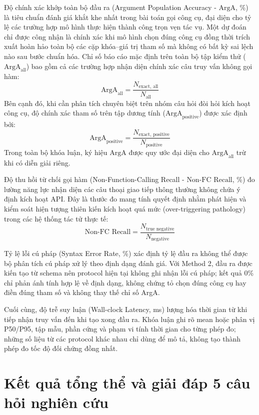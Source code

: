 Độ chính xác khớp toàn bộ đầu ra (Argument Population Accuracy - $\text{ArgA}$, \%) là tiêu chuẩn đánh giá khắt khe nhất trong bài toán gọi công cụ, đại diện cho tỷ lệ các trường hợp mô hình thực hiện thành công trọn vẹn tác vụ. Một dự đoán chỉ được công nhận là chính xác khi mô hình chọn đúng công cụ đồng thời trích xuất hoàn hảo toàn bộ các cặp khóa–giá trị tham số mà không có bất kỳ sai lệch nào sau bước chuẩn hóa. Chỉ số báo cáo mặc định trên toàn bộ tập kiểm thử ($\text{ArgA}_{\text{all}}$) bao gồm cả các trường hợp nhận diện chính xác câu truy vấn không gọi hàm:
$$\text{ArgA}_{\text{all}} = \frac{N_{\text{exact, all}}}{N_{\text{all}}}$$
Bên cạnh đó, khi cần phân tích chuyên biệt trên nhóm câu hỏi đòi hỏi kích hoạt công cụ, độ chính xác tham số trên tập dương tính ($\text{ArgA}_{\text{positive}}$) được xác định bởi:
$$\text{ArgA}_{\text{positive}} = \frac{N_{\text{exact, positive}}}{N_{\text{positive}}}$$
Trong toàn bộ khóa luận, ký hiệu $\text{ArgA}$ được quy ước đại diện cho $\text{ArgA}_{\text{all}}$ trừ khi có diễn giải riêng.

Độ thu hồi từ chối gọi hàm (Non-Function-Calling Recall - $\text{Non-FC Recall}$, \%) đo lường năng lực nhận diện các câu thoại giao tiếp thông thường không chứa ý định kích hoạt API. Đây là thước đo mang tính quyết định nhằm phát hiện và kiểm soát hiện tượng thiên kiến kích hoạt quá mức (over-triggering pathology) trong các hệ thống tác tử thực tế:
$$\text{Non-FC Recall} = \frac{N_{\text{true negative}}}{N_{\text{negative}}}$$

Tỷ lệ lỗi cú pháp (Syntax Error Rate, \%) xác định tỷ lệ đầu ra không thể được bộ phân tích cú pháp xử lý theo định dạng đánh giá. Với Method 2, đầu ra được kiến tạo từ schema nên protocol hiện tại không ghi nhận lỗi cú pháp; kết quả 0\% chỉ phản ánh tính hợp lệ về định dạng, không chứng tỏ chọn đúng công cụ hay điền đúng tham số và không thay thế chỉ số ArgA.

Cuối cùng, độ trễ suy luận (Wall-clock Latency, ms) lượng hóa thời gian từ khi tiếp nhận truy vấn đến khi tạo xong đầu ra. Khóa luận ghi rõ mean hoặc phân vị P50/P95, tập mẫu, phần cứng và phạm vi tính thời gian cho từng phép đo; những số liệu từ các protocol khác nhau chỉ dùng để mô tả, không tạo thành phép đo tốc độ đối chứng đồng nhất.

\section{Kết quả tổng thể và giải đáp 5 câu hỏi nghiên cứu}

